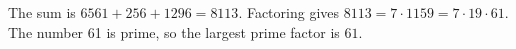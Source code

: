 The sum is $ 6561+256+1296=8113 $. Factoring gives $ 8113=7\cdot1159=7\cdot19\cdot61 $. The number 61 is prime, so the largest prime factor is $\boxed{61}$.
